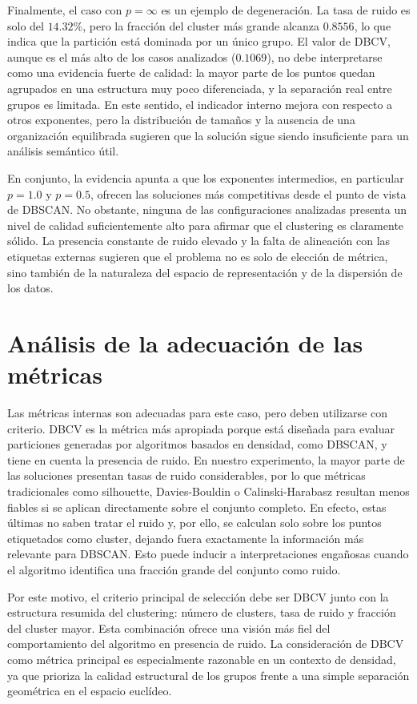\documentclass[11pt]{article}
\begin{document}
Finalmente, el caso con $p=\infty$ es un ejemplo de degeneración. La tasa de ruido es solo del $14.32\%$, pero la fracción del cluster más grande alcanza $0.8556$, lo que indica que la partición está dominada por un único grupo. El valor de DBCV, aunque es el más alto de los casos analizados ($0.1069$), no debe interpretarse como una evidencia fuerte de calidad: la mayor parte de los puntos quedan agrupados en una estructura muy poco diferenciada, y la separación real entre grupos es limitada. En este sentido, el indicador interno mejora con respecto a otros exponentes, pero la distribución de tamaños y la ausencia de una organización equilibrada sugieren que la solución sigue siendo insuficiente para un análisis semántico útil.

En conjunto, la evidencia apunta a que los exponentes intermedios, en particular $p=1.0$ y $p=0.5$, ofrecen las soluciones más competitivas desde el punto de vista de DBSCAN. No obstante, ninguna de las configuraciones analizadas presenta un nivel de calidad suficientemente alto para afirmar que el clustering es claramente sólido. La presencia constante de ruido elevado y la falta de alineación con las etiquetas externas sugieren que el problema no es solo de elección de métrica, sino también de la naturaleza del espacio de representación y de la dispersión de los datos.

\section{Análisis de la adecuación de las métricas}

Las métricas internas son adecuadas para este caso, pero deben utilizarse con criterio. DBCV es la métrica más apropiada porque está diseñada para evaluar particiones generadas por algoritmos basados en densidad, como DBSCAN, y tiene en cuenta la presencia de ruido. En nuestro experimento, la mayor parte de las soluciones presentan tasas de ruido considerables, por lo que métricas tradicionales como silhouette, Davies-Bouldin o Calinski-Harabasz resultan menos fiables si se aplican directamente sobre el conjunto completo. En efecto, estas últimas no saben tratar el ruido y, por ello, se calculan solo sobre los puntos etiquetados como cluster, dejando fuera exactamente la información más relevante para DBSCAN. Esto puede inducir a interpretaciones engañosas cuando el algoritmo identifica una fracción grande del conjunto como ruido.

Por este motivo, el criterio principal de selección debe ser DBCV junto con la estructura resumida del clustering: número de clusters, tasa de ruido y fracción del cluster mayor. Esta combinación ofrece una visión más fiel del comportamiento del algoritmo en presencia de ruido. La consideración de DBCV como métrica principal es especialmente razonable en un contexto de densidad, ya que prioriza la calidad estructural de los grupos frente a una simple separación geométrica en el espacio euclídeo.
\end{document}
